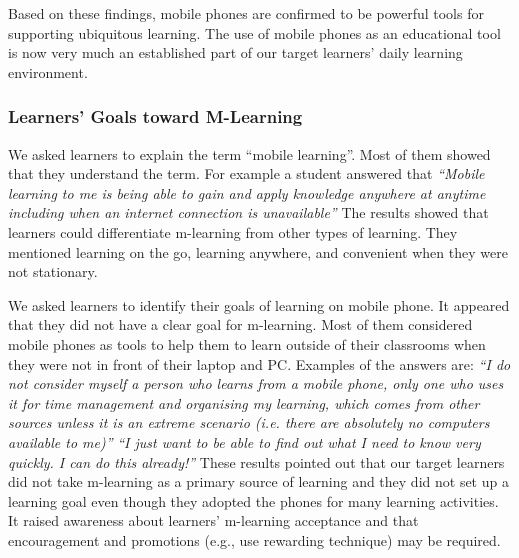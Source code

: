 \documentclass[a4paper,twoside]{article}
\begin{document}
Based on these findings, mobile phones are confirmed to be powerful tools for supporting ubiquitous learning. The use of mobile phones as an educational tool is now very much an established part of our target learners' daily learning environment. 


\subsubsection{Learners' Goals toward M-Learning}
\noindent We asked learners to explain the term ``mobile learning''. Most of them showed that they understand the term. For example a student answered that 
\newline 
\newline 
\textit{``Mobile learning to me is being able to gain and apply knowledge anywhere at anytime including when an internet connection is unavailable''}
\newline 
\newline 
\indent The results showed that learners could differentiate m-learning from other types of learning. They mentioned learning on the go, learning anywhere, and convenient when they were not stationary. 

We asked learners to identify their goals of learning on mobile phone.  It appeared that they did not have a clear goal for m-learning. Most of them considered mobile phones as tools to help them to learn outside of their classrooms when they were not in front of their laptop and PC. Examples of the answers are: 
\newline 
\newline 
\textit{``I do not consider myself a person who learns from a mobile phone, only one who uses it for time management and organising my learning, which comes from other sources unless it is an extreme scenario (i.e. there are absolutely no computers available to me)''}
\newline
\newline 
\textit{``I just want to be able to find out what I need to know very quickly. I can do this already!''}
\newline 
\newline 
\indent These results pointed out that our target learners did not take m-learning as a primary source of learning and they did not set up a learning goal even though they adopted the phones for many learning activities. It raised awareness about learners' m-learning acceptance and that encouragement and promotions (e.g., use rewarding technique) may be required. 
\end{document}
